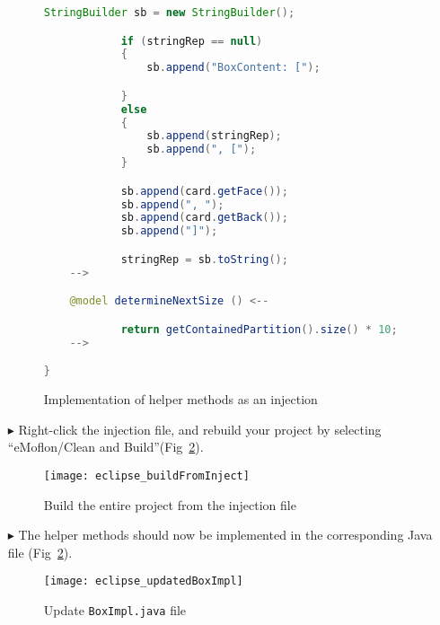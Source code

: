 \begin{itemize}
\begin{figure}[htbp]
\begin{lstlisting}[language=Java, keywordstyle={\bfseries\color{purple}}, backgroundcolor=\color{white}]
            StringBuilder sb = new StringBuilder();

            if (stringRep == null)
            {
                sb.append("BoxContent: [");

            }
            else
            {
                sb.append(stringRep);
                sb.append(", [");
            }

            sb.append(card.getFace());
            sb.append(", ");
            sb.append(card.getBack());
            sb.append("]");

            stringRep = sb.toString();
    -->

    @model determineNextSize () <--

            return getContainedPartition().size() * 10;
    -->

}
        \end{lstlisting}
        \caption{Implementation of helper methods as an injection}
        \label{code:complete_inject_file}
    \end{figure}
    \FloatBarrier

\item[$\blacktriangleright$] Right-click the injection file, and rebuild your project by selecting ``eMoflon/Clean and
Build''(Fig~\ref{fig:eclipse_buildFromInjecton}).

\vspace{0.5cm}

\begin{figure}[htbp]
    \centering
    \texttt{[image: eclipse\_buildFromInject]}
    \caption{Build the entire project from the injection file}
    \label{fig:eclipse_buildFromInjecton}
\end{figure}

\vspace{0.5cm}

\item[$\blacktriangleright$] The helper methods should now be implemented in the corresponding Java file (Fig~\ref{fig:eclipse_buildFromInjecton}).

\clearpage

\begin{figure}[htbp]
    \centering
    \texttt{[image: eclipse\_updatedBoxImpl]}
    \caption{Update \texttt{BoxImpl.java} file}
    \label{fig:eclipse_updatedBoxImpl}
\end{figure}

\vspace{0.5cm}


\end{itemize}
